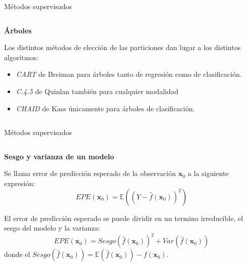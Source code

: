 \begin{frame}{Métodos supervisados}
\begin{columns}
\begin{column}{0.9\textwidth}
\textbf{Árboles}

Los distintos métodos de elección de las particiones dan lugar a los distintos algoritmos:
\begin{itemize}
\item \emph{CART} de Breiman para árboles tanto de regresión como de clasificación. 
\item  \emph{C.4.5} de Quinlan también para cualquier modalidad 
\item \emph{CHAID} de Kass únicamente para árboles de clasificación. 
\end{itemize}
 
\end{column}
\end{columns}
\end{frame}

\begin{frame}{Métodos supervisados}
\begin{columns}
\begin{column}{0.9\textwidth}
\textbf{Sesgo y varianza de un modelo}

\begin{defi}
Se llama error de predicción esperado de la observación $\mathbf{x}_0$ a la siguiente expresión:
\begin{equation}
EPE(\mathbf{x}_0)=\mathbb{E}((Y-\hat{f}(\mathbf{x}_0))^2)
\end{equation}
\end{defi}

\begin{propo}
El error de predicción esperado se puede dividir en un termino irreducible, el sesgo del modelo y la varianza:
\begin{equation}
EPE(\mathbf{x}_0)=Sesgo(\hat{f}(\mathbf{x}_0))^2+Var(\hat{f}(\mathbf{x}_0))
\end{equation}
\noindent donde el $Sesgo(\hat{f}(\mathbf{x}_0))=\mathbb{E}(\hat{f}(\mathbf{x}_0))-f(\mathbf{x}_0)$.
\end{propo}
\end{column}
\end{columns}
\end{frame}

